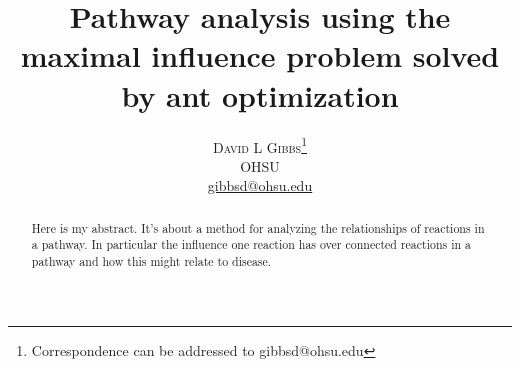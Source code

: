 \documentclass[twoside]{article}
\title{\vspace{-15mm}\fontsize{24pt}{10pt}\selectfont\textbf{Pathway
    analysis using the maximal influence problem solved by ant optimization}} %
\author{
\large
\textsc{David L Gibbs}\thanks{Correspondence can be addressed to gibbsd@ohsu.edu}\\[2mm] %
\normalsize OHSU \\ %
\normalsize \href{mailto:gibbsd@ohsu.edu}{gibbsd@ohsu.edu} %
\vspace{-5mm}
}
\date{}
\begin{document}
\maketitle 
\thispagestyle{fancy} %


\begin{abstract}

\noindent Here is my abstract. It's about a method for analyzing the
relationships of reactions in a pathway. In particular the influence
one reaction has over connected reactions in a pathway and how this
might relate to disease.

\end{abstract}

\end{document}
